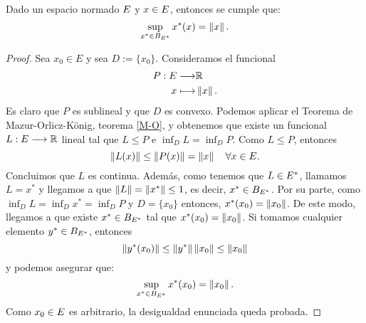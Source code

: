\bigskip
\begin{corolarioBox}\label{iguSupNor}
	Dado un espacio normado $ E $ y $ x \in E $, entonces se cumple que:
	\begin{equation}\label{iguNorm}
	\sup_{x^* \in B_{E ^ *}} x^*(x) = \left\Vert x\right\Vert.
	\end{equation}
\end{corolarioBox}
\begin{proof}
	Sea $ x_0 \in E$ y sea $ D := \{x_0\} $. Consideramos el funcional 
	\begin{equation*}
	\begin{split}
	P:E \longrightarrow &\mathbb{R} \\
	x \longmapsto &\left\Vert x\right\Vert.
	\end{split}
	\end{equation*} 
	Es claro que $ P $ es sublineal y que $ D $ es convexo. Podemos aplicar el Teorema de Mazur-Orlicz-König, teorema \ref{M-O}, y obtenemos que existe un funcional $ L:E \longrightarrow \mathbb{R} $ lineal tal que $ L \leq P $ e $ \inf_D L = \inf_D P $. Como $ L \leq P $, entonces 
	\begin{equation*}
	\left\Vert L(x)\right\Vert \leq \left\Vert P(x)\right\Vert = \left\Vert x\right\Vert \quad \forall x \in E.
	\end{equation*}
	Concluimos que $ L $ es continua. Además, como tenemos que $ L \in E ^* $, llamamos $ L = x^* $ y llegamos a que $ \left\Vert L\right\Vert = \left\Vert x^*\right\Vert  \leq 1$, es decir, $ x^* \in  B_{E ^ *} $.  Por su parte, como  $ \inf_D L = \inf_D x^* = \inf_D P $ y $ D = \{x_0\} $ entonces, $ x^*(x_0) = \left\Vert x_0\right\Vert $. De este modo, llegamos a que existe $ x^* \in B_{E^*} $ tal que $ x^*(x_0) = \left\Vert x_0\right\Vert $. Si tomamos cualquier elemento $ y^* \in B_{E^*}  $, entonces \[ \left\Vert y^*(x_0)\right\Vert \leq \left\Vert y^*\right\Vert \left\Vert x_0\right\Vert \leq \left\Vert x_0\right\Vert \] y podemos asegurar que:
	\[
	\sup_{x^* \in B_{E ^ *}} x^*(x_0) = \left\Vert x_0\right\Vert.
	\] 
	Como $ x_0 \in E $ es arbitrario, la desigualdad enunciada queda probada.
\end{proof}
\bigskip
